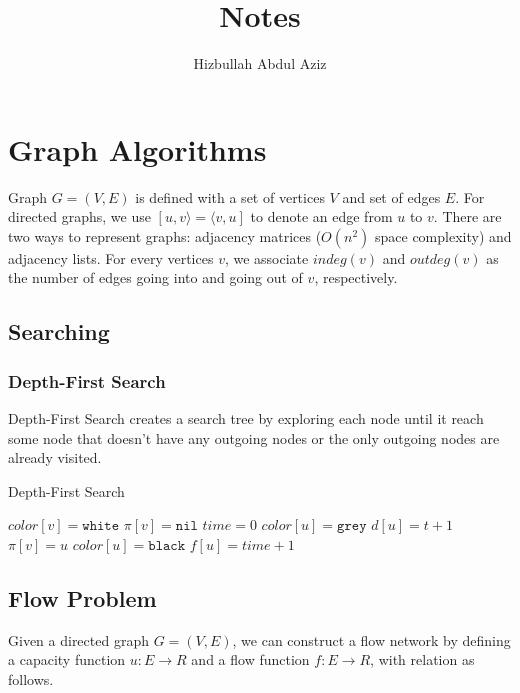 \documentclass{article}
\author{Hizbullah Abdul Aziz}
\title{Notes}
\begin{document}
\maketitle

\section{Graph Algorithms}
Graph $G=(V,E)$ is defined with a set of vertices $V$ and set of edges $E$.
For directed graphs, we use $[u,v\rangle=\langle v,u]$ to denote an edge from
$u$ to $v$.  There are two ways to represent graphs: adjacency matrices
($O(n^2)$ space complexity) and adjacency lists.  For every vertices $v$, we
associate $indeg(v)$ and $outdeg(v)$ as the number of edges going into and
going out of $v$, respectively.

\subsection{Searching}
\subsubsection{Depth-First Search}
Depth-First Search creates a search tree by exploring each node until it reach
some node that doesn't have any outgoing nodes or the only outgoing nodes are
already visited.
\begin{algorithm}
  \caption{Depth-First Search}\label{graph:dfs}
  \begin{algorithmic}
      \State $color[v]=\texttt{white}$
      \State $\pi[v]=\texttt{nil}$
    \EndFor
    \State $time = 0$
        \State{}
      \EndIf
    \EndFor
    \EndFunction
    \State
      \State $color[u]=\texttt{grey}$
      \State $d[u]=t+1$
        \State{}
        \State $\pi[v]=u$
      \EndIf
      \State $color[u]=\texttt{black}$
      \State $f[u]=time+1$
      \EndFor
    \EndFunction
  \end{algorithmic}
\end{algorithm}


\subsection{Flow Problem}
Given a directed graph $G=(V, E)$, we can construct a flow network by defining
a capacity function $u: E\rightarrow R$ and a flow function $f: E\rightarrow
R$, with relation as follows.
\end{document}
